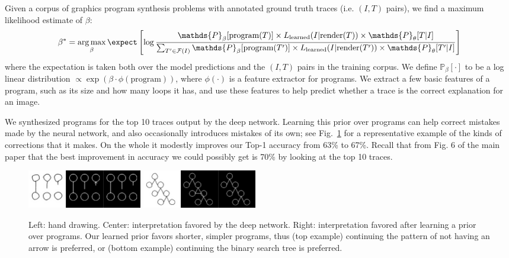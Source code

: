 \documentclass{article}
\DeclareMathOperator*{\argmax}{arg\,max} %
\newcommand{\probability}{\mathds{P}} %
\begin{document}
Given a corpus of graphics program synthesis problems with annotated ground truth traces (i.e. $(I,T)$ pairs),
we find a maximum likelihood estimate of $\beta$:
\begin{equation}
  \beta^* = \argmax_{\beta} \expect \left[ \log \frac{\probability_{\beta} [\text{program}(T)]\times L_{\text{learned}}(I|\text{render}(T))\times \probability_\theta[T|I]}{\sum_{T'\in \mathcal{F}(I)} \probability_{\beta} [\text{program}(T')]\times L_{\text{learned}}(I|\text{render}(T'))\times \probability_\theta[T'|I]} \right]
\end{equation}
where the expectation is taken both over the model predictions and the
$(I,T)$ pairs in the training corpus.  We define $\probability_{\beta}
[\cdot]$ to be a log linear distribution $\propto \exp
(\beta\cdot \phi(\text{program}))$, where $\phi(\cdot)$ is a feature
extractor for programs.  We extract a few basic features of a
program, such as its size and how many loops it has, and use these
features to help predict whether a trace is the correct explanation
for an image.

We synthesized programs for the top 10 traces
output by the deep network.  Learning this prior over programs can
help correct mistakes made by the neural network, and also
occasionally introduces mistakes of its own; see
Fig.~\ref{exampleOfProgramCorrectingMistake} for a representative
example of the kinds of corrections that it makes. On the whole
it modestly improves our Top-1 accuracy from 63\% to 67\%.  Recall that
from Fig. 6 of the main paper that the best improvement
in accuracy we could possibly get is 70\% by looking at the top 10 traces. 
\begin{figure}
  \includegraphics[width = 5cm]{figures/programSuccess7.png}
  \includegraphics[width = 5cm]{figures/programSuccess16.png}
  \caption{Left: hand drawing. Center: interpretation favored by the deep network. Right: interpretation favored after learning a prior over programs. Our learned prior favors shorter, simpler programs, thus (top example) continuing the pattern of not having an arrow is preferred, or (bottom example) continuing the binary search tree is preferred.}\label{exampleOfProgramCorrectingMistake}
\end{figure}
\end{document}
